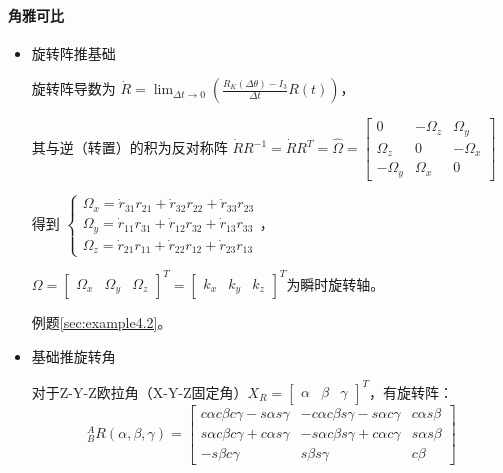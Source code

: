 \documentclass[
12pt, %
a4paper, 
oneside, %
headinclude,footinclude, %
]{scrartcl}
\begin{document}
\paragraph{角雅可比}
\begin{itemize}
\item 旋转阵推基础\label{sec:Rotation_matrix}

旋转阵导数为
$ \dot{R} = \lim_{\Delta t \to 0} (\frac{R_K(\Delta\theta) - I_3}{\Delta t} R(t)) $，

其与逆（转置）的积为反对称阵
$ \dot{R} R^{-1} = \dot{R} R^T = \hat{\Omega} = \begin{bmatrix} 0 & -\Omega_z & \Omega_y \\ \Omega_z & 0 & -\Omega_x \\ -\Omega_y & \Omega_x & 0 \end{bmatrix} $

得到
$
\begin{cases}
\Omega_x = \dot{r}_{31} r_{21} + \dot{r}_{32} r_{22} + \dot{r}_{33} r_{23} \\
\Omega_y = \dot{r}_{11} r_{31} + \dot{r}_{12} r_{32} + \dot{r}_{13} r_{33} \\
\Omega_z = \dot{r}_{21} r_{11} + \dot{r}_{22} r_{12} + \dot{r}_{23} r_{13}
\end{cases}
$，

$ \Omega = \begin{bmatrix} \Omega_x & \Omega_y & \Omega_z \end{bmatrix}^T = \begin{bmatrix} k_x & k_y & k_z \end{bmatrix}^T $为瞬时旋转轴。

例题\ref{sec:example4.2}。
\item 基础推旋转角

对于Z-Y-Z欧拉角（X-Y-Z固定角）$ X_R = \begin{bmatrix} \alpha & \beta & \gamma \end{bmatrix}^T $，有旋转阵：
$$
^A_B R(\alpha, \beta, \gamma) =
\begin{bmatrix}
c\alpha c\beta c\gamma - s\alpha s\gamma & -c\alpha c\beta s\gamma - s\alpha c\gamma & c\alpha s\beta \\
s\alpha c\beta c\gamma + c\alpha s\gamma & -s\alpha c\beta s\gamma + c\alpha c\gamma & s\alpha s\beta \\
-s\beta c\gamma & s\beta s\gamma & c\beta
\end{bmatrix}
$$


\end{itemize}
\end{document}
